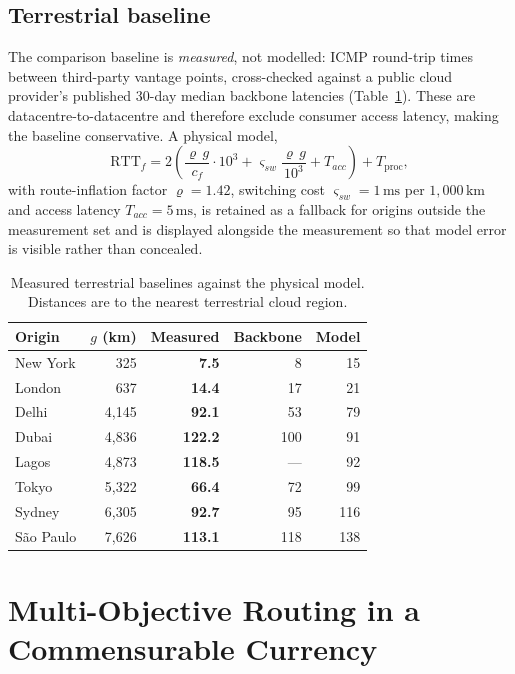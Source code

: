 \documentclass[10pt,twocolumn]{article}
\newcommand{\ms}{\,\mathrm{ms}}
\newcommand{\km}{\,\mathrm{km}}
\begin{document}
\subsection{Terrestrial baseline}

The comparison baseline is \emph{measured}, not modelled: ICMP round-trip times
between third-party vantage points, cross-checked against a public cloud
provider's published $30$-day median backbone latencies
(Table~\ref{tab:baseline}). These are datacentre-to-datacentre and therefore
exclude consumer access latency, making the baseline conservative. A physical
model,
\begin{equation}
\mathrm{RTT}_{f}=2\left(\frac{\varrho\, g}{c_{f}}\cdot10^{3}
+ \varsigma_{sw}\frac{\varrho\, g}{10^{3}} + T_{acc}\right)+T_{\mathrm{proc}},
\end{equation}
with route-inflation factor $\varrho=1.42$, switching cost
$\varsigma_{sw}=1\ms$ per $1{,}000\km$ and access latency $T_{acc}=5\ms$, is
retained as a fallback for origins outside the measurement set and is displayed
alongside the measurement so that model error is visible rather than concealed.

\begin{table}[t]
\centering
\caption{Measured terrestrial baselines against the physical model. Distances
are to the nearest terrestrial cloud region.}
\label{tab:baseline}
\small
\begin{tabular}{@{}lrrrr@{}}
\toprule
Origin & $g$ (km) & Measured & Backbone & Model \\
\midrule
New York   &   325 & \textbf{7.5} &   8 &  15 \\
London     &   637 & \textbf{14.4}&  17 &  21 \\
Delhi      & 4{,}145 & \textbf{92.1}&  53 &  79 \\
Dubai      & 4{,}836 & \textbf{122.2}& 100 &  91 \\
Lagos      & 4{,}873 & \textbf{118.5}& --- &  92 \\
Tokyo      & 5{,}322 & \textbf{66.4}&  72 &  99 \\
Sydney     & 6{,}305 & \textbf{92.7}&  95 & 116 \\
S\~{a}o Paulo & 7{,}626 & \textbf{113.1}& 118 & 138 \\
\bottomrule
\end{tabular}
\end{table}

\section{Multi-Objective Routing in a Commensurable Currency}
\label{sec:cost}
\end{document}
